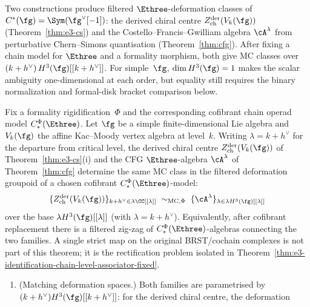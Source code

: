 
Two constructions produce filtered $\Ethree$-deformation classes
of $C^*(\fg) = \Sym(\fg^\vee[-1])$: the derived chiral
centre $Z^{\mathrm{der}}_{\mathrm{ch}}(V_k(\fg))$
(Theorem~\ref{thm:e3-cs}) and the
Costello--Francis--Gwilliam algebra $\cA^\lambda$ from
perturbative Chern--Simons quantisation
(Theorem~\ref{thm:cfg}). After fixing a chain model for
$\Ethree$ and a formality morphism, both give MC classes over
$(k+h^\vee)\,H^3(\fg)[[k+h^\vee]]$. For simple~$\fg$,
$\dim H^3(\fg)=1$ makes the scalar ambiguity one-dimensional at
each order, but equality still requires the binary normalization and
formal-disk bracket comparison below.

\begin{theorem}
\label{thm:e3-identification}
\ClaimStatusConditional
Fix a formality rigidification~$\Phi$ and the corresponding
cofibrant chain operad model $C_*^\Phi(\Ethree)$. Let $\fg$ be a
simple finite-dimensional Lie algebra and
$V_k(\fg)$ the affine Kac--Moody vertex algebra at
level~$k$.
Writing $\lambda = k + h^\vee$ for the departure from
critical level, the derived chiral centre
$Z^{\mathrm{der}}_{\mathrm{ch}}(V_k(\fg))$ of
Theorem~\textup{\ref{thm:e3-cs}(i)} and the
CFG $\Ethree$-algebra $\cA^\lambda$ of
Theorem~\textup{\ref{thm:cfg}} determine the same MC class in the
filtered deformation groupoid of a chosen cofibrant
$C_*^\Phi(\Ethree)$-model:
\begin{equation}\label{eq:e3-families}
 \{Z^{\mathrm{der}}_{\mathrm{ch}}(V_k(\fg))
 \}_{k + h^\vee \in \lambda\CC[[\lambda]]}
 \;\sim_{\mathrm{MC},\Phi}\; \{\cA^\lambda\}_{\lambda
 \in \lambda H^3(\fg)[[\lambda]]}
\end{equation}
over the base $\lambda H^3(\fg)[[\lambda]]$
\textup{(}with $\lambda = k + h^\vee$\textup{)}. Equivalently,
after cofibrant replacement there is a filtered zig-zag of
$C_*^\Phi(\Ethree)$-algebras connecting the two families. A single
strict map on the original BRST/cochain complexes is not part of
this theorem; it is the rectification problem isolated in
Theorem~\ref{thm:e3-identification-chain-level-associator-fixed}.
\begin{enumerate}[label=\textup{(\roman*)}]
\item \textup{(Matching deformation spaces.)}
 Both families are parametrised by
 $(k+h^\vee) H^3(\fg)[[k+h^\vee]]$:
 for the derived chiral centre, the deformation

\end{enumerate}
\end{theorem}
